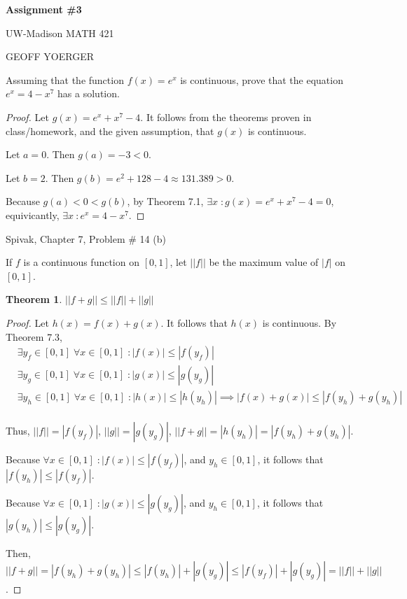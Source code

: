 \documentclass{article} %
\theoremstyle{plain}
\newtheorem*{theorem*}{Theorem}
\theoremstyle{definition}
\begin{document}
\begin{center}
    \Large{
        \textbf{Assignment \#3}

        UW-Madison MATH 421
    }
    
    \vspace{5pt}
        
    \normalsize{
        GEOFF YOERGER

        \usdate
    }
    
    \vspace{15pt}
\end{center}

\noindent{} Assuming that the function $f(x) = e^x$ is continuous, prove that the equation $e^x = 4-x^7$ has a solution. 

\begin{proof} Let $g(x) = e^x + x^7 - 4$. It follows from the theorems proven in class/homework, and the given assumption, that $g(x)$ is continuous.

    Let $a = 0$. Then $g(a) = -3 < 0$.

    Let $b = 2$. Then $g(b) = e^2 + 128 - 4 \approx 131.389 > 0$.

    Because $g(a) < 0 < g(b)$, by Theorem 7.1, $\exists x \; \colon g(x) = e^x + x^7 - 4 = 0$, equivicantly, $\exists x \: \colon e^x = 4 - x^7$.
\end{proof} 


\noindent{} Spivak, Chapter 7, Problem \# 14 (b)

If $f$ is a continuous function on $[0,1]$, let $||f||$ be the maximum value of $|f|$ on $[0,1]$.

\begin{theorem*} $||f + g|| \leq ||f|| + ||g||$
\end{theorem*}

\begin{proof} Let $h(x) = f(x) + g(x)$.  It follows that $h(x)$ is continuous. By Theorem 7.3, 
    \begin{align*}
        & \exists y_f \in [0,1] \; \forall x \in [0,1] \; \colon |f(x)| \leq |f(y_f)| \\
        & \exists y_g \in [0,1] \; \forall x \in [0,1] \; \colon |g(x)| \leq |g(y_g)| \\
        & \exists y_h \in [0,1] \; \forall x \in [0,1] \; \colon |h(x)| \leq |h(y_h)| \implies |f(x) + g(x)| \leq |f(y_h) + g(y_h)| \\
    \end{align*}

    Thus, $||f|| = |f(y_f)|$, $||g|| = |g(y_g)|$, $||f+g|| = |h(y_h)| = |f(y_h) + g(y_h)|$.

    Because $\forall x \in [0,1] \; \colon |f(x)| \leq |f(y_f)|$, and $y_h \in [0,1]$, it follows that $|f(y_h)| \leq |f(y_f)|$.

    Because $\forall x \in [0,1] \; \colon |g(x)| \leq |g(y_g)|$, and $y_h \in [0,1]$, it follows that $|g(y_h)| \leq |g(y_g)|$.

    Then, $||f+g|| = |f(y_h) + g(y_h)| \leq |f(y_h)| + |g(y_g)| \leq |f(y_f)| + |g(y_g)| = ||f|| + ||g||$.
\end{proof} 
\end{document}
